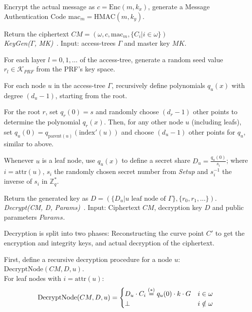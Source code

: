 Encrypt the actual message as $c = \text{Enc}(m, k_x)$, generate a Message Authentication Code $\text{mac}_m = \text{HMAC}(m, k_y)$.

Return the ciphertext $CM = (\omega, c, \text{mac}_m, \{C_i | i \in \omega\})$\\

\emph{KeyGen($\Gamma$, MK)}~\cite{yao_lightweight_2015}.
Input: \glspl{access-tree} $\Gamma$ and master key $MK$.

For each layer $l = 0, 1, \dots$ of the \gls{access-tree}, generate a random seed value $r_l \in \mathcal{K}_{PRF}$ from the PRF's key space.

For each node $u$ in the \gls{access-tree} $\Gamma$, recursively define polynomials $q_u(x)$ with degree $(d_u - 1)$, starting from the root.

For the root $r$, set $q_r(0) = s$ and randomly choose $(d_r - 1)$ other points to determine the polynomial $q_r(x)$.
Then, for any other node $u$ (including leafs), set $q_u(0) = q_{\text{parent}(u)}(\text{index}'(u))$ and choose $(d_u -1)$ other points for $q_u$, similar to above.

Whenever $u$ is a leaf node, use $q_u(x)$ to define a secret share $D_u = \frac{q_u(0)}{s_i}$; where $i = \text{attr}(u)$, $s_i$ the randomly chosen secret number from \emph{Setup} and $s_i^{-1}$ the inverse of $s_i$ in $\mathbb{Z}_q^*$.

Return the generated key as $D = (\{D_u | u \text{ leaf node of } \Gamma\}, \{r_0, r_1, \dots \})$.
\\

\emph{Decrypt(CM, D, Params)}~\cite{yao_lightweight_2015}. Input: Ciphertext $CM$, decryption key $D$ and public parameters $Params$.

Decryption is split into two phases: Reconstructing the curve point $C'$ to get the encryption and integrity keys, and actual decryption of the ciphertext.

First, define a recursive decryption procedure for a node $u$: $\text{DecryptNode}(CM, D, u)$. \\
For leaf nodes with $i = \text{attr}(u)$:
\begin{equation*}
    \text{DecryptNode}(CM, D, u) = \begin{cases}
        D_u \cdot C_i \stackrel{(*)}{=} q_u(0) \cdot k \cdot G & i \in \omega\\
        \perp & i \notin \omega
    \end{cases}\\
\end{equation*}

